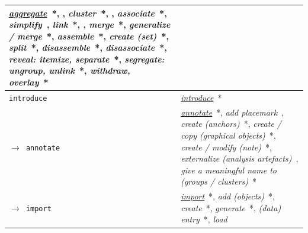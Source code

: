 \begin{table}
\begin{center}
\begin{tabular}{p{}>{\RaggedRight}p{}}
        	{\it \underline{aggregate}}~\cite{Mullins1993}*, \cite{Chi1998,Munzner2009a}, %
        	{\it cluster}~\cite{Card1999}*, \cite{Chi1998}, %
        	{\it associate}~\cite{Mullins1993,Wehrend1990,Zhou1998}*,
        	{\it simplify}~\cite{Chi1998},
        	{\it link}~\cite{Buja1996,Dix1998,Keim2002,Mullins1993}*, \cite{Shrinivasan2008,Wilkinson2005},
        	{\it merge}~\cite{Gotz2008}*, %
        	{\it generalize / merge}~\cite{Zhou1998}*,
        	{\it assemble}~\cite{Mullins1993}*,
        	{\it create (set)}~\cite{Chuah1996}*, %
        	{\it split}~\cite{Gotz2008}*,
        	{\it disassemble}~\cite{Mullins1993}*,
        	{\it disassociate}~\cite{Mullins1993}*,
        	{\it reveal: itemize, separate}~\cite{Zhou1998}*,
        	{\it segregate: ungroup, unlink}~\cite{Mullins1993}*,
        	{\it withdraw, overlay}~\cite{Mullins1993}*
    
    \\ \hline \rowcolor{blue!10} 
    
        {\tt introduce} &
    
    	    {\it \underline{introduce}}~\cite{Mullins1993}*
    
    \\
    
        {\tt $\rightarrow$ annotate}\index{{\tt annotate}} &
    
        	{\it \underline{annotate}}~\cite{Gotz2008,Heer2012,Roth2012,Roth2013}*,
        	{\it add placemark}~\cite{Yi2007},
        	{\it create (anchors)}~\cite{Liu2010}*,
        	{\it create / copy (graphical objects)}~\cite{Chuah1996}*,
        	{\it create / modify (note)}~\cite{Gotz2008}*,
        	{\it externalize (analysis artefacts)}~\cite{Shrinivasan2008},
        	{\it give a meaningful name to (groups / clusters)}~\cite{Lee2006}*
    
    \\ \rowcolor{gray!10}
    
        {\tt $\rightarrow$ import}\index{{\tt import}} &
    
        	{\it \underline{import}}~\cite{Roth2012,Roth2013}*,
        	{\it add (objects)}~\cite{Chuah1996}*,
        	{\it create}~\cite{Card1999,Mullins1993}*,
        	{\it generate}~\cite{Raskin2000}*,
        	{\it (data) entry}~\cite{Mullins1993}*,
        	{\it load}~\cite{Liu2010}
    
    \\
    

\end{tabular}
\end{center}
\end{table}
